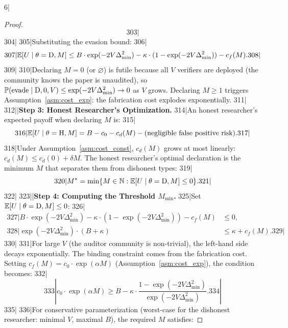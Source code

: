 6|\documentclass[12pt,a4paper]{article}
\begin{document}
\begin{proof}
\begin{equation}
303|\end{equation}
304|
305|Substituting the evasion bound:
306|\begin{equation}\label{eq:U_dis_bound}
307|    \mathbb{E}[U \mid \theta = \text{D}, M] \le B \cdot \exp(-2V\Delta_{\min}^2) - \kappa \cdot (1 - \exp(-2V\Delta_{\min}^2)) - c_f(M).
308|\end{equation}
309|
310|Declaring $M = 0$ (or $\varnothing$) is futile because all $V$ verifiers are deployed (the community knows the paper is unaudited), so $\mathbb{P}(\text{evade} \mid \text{D}, 0, V) \le \exp(-2V\Delta_{\min}^2) \to 0$ as $V$ grows. Declaring $M \ge 1$ triggers Assumption~\ref{asm:cost_exp}: the fabrication cost explodes exponentially.
311|
312||\noindent\textbf{Step 3: Honest Researcher's Optimization.}
314|An honest researcher's expected payoff when declaring $M$ is:
315|\begin{equation}\label{eq:U_hon}
316|    \mathbb{E}[U \mid \theta = \text{H}, M] = B - c_0 - c_d(M) - \text{(negligible false positive risk)}.
317|\end{equation}
318|Under Assumption~\ref{asm:cost_const}, $c_d(M)$ grows at most linearly: $c_d(M) \le c_d(0) + \delta M$. The honest researcher's optimal declaration is the minimum $M$ that separates them from dishonest types:
319|\begin{equation}\label{eq:honest_opt}
320|    M^* = \min\{M \in \mathbb{N} : \mathbb{E}[U \mid \theta = \text{D}, M] \le 0\}.
321|\end{equation}
322|
323||\noindent\textbf{Step 4: Computing the Threshold $M_{\min}$.}
325|Set $\mathbb{E}[U \mid \theta = \text{D}, M] \le 0$:
326|\begin{align}
327|    B \cdot \exp(-2V\Delta_{\min}^2) - \kappa \cdot (1 - \exp(-2V\Delta_{\min}^2)) - c_f(M) &\le 0, \\
328|    \exp(-2V\Delta_{\min}^2) \cdot (B + \kappa) &\le \kappa + c_f(M).
329|\end{align}
330|
331|For large $V$ (the auditor community is non-trivial), the left-hand side decays exponentially. The binding constraint comes from the fabrication cost. Setting $c_f(M) = c_0 \cdot \exp(\alpha M)$ (Assumption~\ref{asm:cost_exp}), the condition becomes:
332|\begin{equation}
333|    c_0 \cdot \exp(\alpha M) \ge B - \kappa \cdot \frac{1 - \exp(-2V\Delta_{\min}^2)}{\exp(-2V\Delta_{\min}^2)}.
334|\end{equation}
335|
336|For conservative parameterization (worst-case for the dishonest researcher: minimal $V$, maximal $B$), the required $M$ satisfies:

\end{proof}
\end{document}
